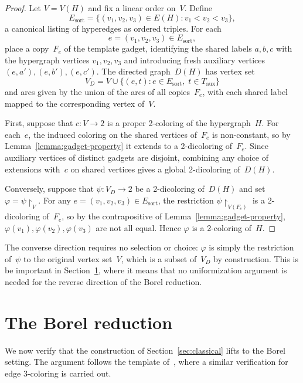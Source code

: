 \documentclass[12pt]{article}
\begin{document}
\begin{proof}
Let $V = V(H)$ and fix a linear order on~$V$.
Define $$E_{\mathrm{sort}} = \bigl\{(v_1,v_2,v_3)\in E(H) : v_1 < v_2 < v_3\bigr\},$$
a canonical listing of hyperedges as ordered triples.
For each $$e=(v_1,v_2,v_3)\in E_{\mathrm{sort}},$$ place a copy~$F_e$ of the template gadget, identifying the shared labels $a,b,c$ with the hypergraph vertices $v_1,v_2,v_3$ and introducing fresh auxiliary vertices $(e,a'),(e,b'),(e,c')$.
The directed graph~$D(H)$ has vertex set $$V_D = V \cup \bigl\{(e,t) : e\in E_{\mathrm{sort}},\; t\in T_{\mathrm{aux}}\bigr\}$$
and arcs given by the union of the arcs of all copies~$F_e$, with each shared label mapped to the corresponding vertex of~$V$.

First, suppose that $c\colon V\to 2$ is a proper 2-coloring of the hypergraph~$H$.
For each~$e$, the induced coloring on the shared vertices of~$F_e$ is non-constant, so by Lemma~\ref{lemma:gadget-property} it extends to a 2-dicoloring of~$F_e$.
Since auxiliary vertices of distinct gadgets are disjoint, combining any choice of extensions with~$c$ on shared vertices gives a global 2-dicoloring of~$D(H)$.

Conversely, suppose that $\psi\colon V_D\to 2$ be a 2-dicoloring of~$D(H)$ and set $\varphi = \psi\restriction_V$.
For any $e = (v_1,v_2,v_3)\in E_{\mathrm{sort}}$, the restriction $\psi\restriction_{V(F_e)}$ is a 2-dicoloring of~$F_e$, so by the contrapositive of Lemma~\ref{lemma:gadget-property}, $\varphi(v_1),\varphi(v_2),\varphi(v_3)$ are not all equal.
Hence $\varphi$ is a 2-coloring of~$H$.
\end{proof}

\begin{remark}\label{rmk:reverse-simple}
The converse direction requires no selection or choice: $\varphi$ is simply the restriction of~$\psi$ to the original vertex set~$V$, which is a subset of~$V_D$ by construction.
This is be important in Section~\ref{sec:borel}, where it means that no uniformization argument is needed for the reverse direction of the Borel reduction.
\end{remark}

\section{The Borel reduction}\label{sec:borel}

We now verify that the construction of Section~\ref{sec:classical} lifts to the Borel setting.
The argument follows the template of~\cite[Theorem~A.9]{thornton2022algebraic}, where a similar verification for edge 3-coloring is carried out.
\end{document}

